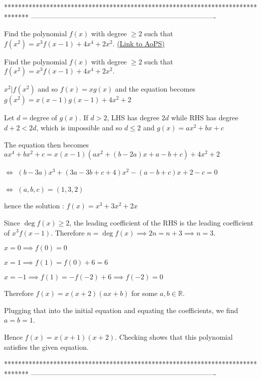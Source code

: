*******************************************************************************
-------------------------------------------------------------------------------

\begin{problem}
	Find the polynomial $f(x)$ with degree $\geq 2$ such that $f(x^2)=x^3f(x-1)+4x^4+2x^2.$
	\flushright \href{https://artofproblemsolving.com/community/c6h351377}{(Link to AoPS)}
\end{problem}



\begin{solution}
	\begin{tcolorbox}Find the polynomial $f(x)$ with degree $\geq 2$ such that $f(x^2)=x^3f(x-1)+4x^4+2x^2.$\end{tcolorbox}
$x^2|f(x^2)$ and so $f(x)=xg(x)$ and the equation becomes $g(x^2)=x(x-1)g(x-1)+4x^2+2$

Let $d=$degree of $g(x)$. 
If $d>2$, LHS has degree $2d$ while RHS has degree $d+2<2d$, which is impossible and so $d\le 2$ and $g(x)=ax^2+bx+c$

The equation then becomes $ax^4+bx^2+c=x(x-1)(ax^2+(b-2a)x+a-b+c)+4x^2+2$

$\iff$ $(b-3a)x^3+(3a-3b+c+4)x^2-(a-b+c)x+2-c=0$

$\iff$ $(a,b,c)=(1,3,2)$

hence the solution : $\boxed{f(x)=x^3+3x^2+2x}$
\end{solution}



\begin{solution}
	Since $\deg f(x)\geqslant 2$, the leading coefficient of the RHS is the leading coefficient of $x^3f(x-1)$. Therefore $n=\deg f(x)\implies 2n=n+3\implies n=3$.

$x=0\implies f(0)=0$

$x=1\implies f(1)=f(0)+6=6$

$x=-1\implies f(1)=-f(-2)+6\implies f(-2)=0$

Therefore $f(x)=x(x+2)(ax+b)$ for some $a,b\in\mathbb{R}$.

Plugging that into the initial equation and equating the coefficients, we find $a=b=1$.

Hence $f(x)=x(x+1)(x+2)$. Checking shows that this polynomial satisfies the given equation.
\end{solution}
*******************************************************************************
-------------------------------------------------------------------------------

